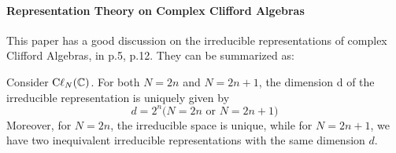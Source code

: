 \documentclass{article}
\begin{document}
\paragraph{Representation Theory on Complex Clifford Algebras}
This paper \cite{West1998} has a good discussion on the irreducible
representations of complex Clifford Algebras, in p.5, p.12. They can be
summarized as:
\begin{thm}
    Consider $\mathrm{C\ell}_{N}(\mathbb{C})$. For both $N = 2n$ and $N = 2n + 1$, the
    dimension d of the irreducible representation is uniquely given by
    \begin{equation}
        d = 2^n \text{($N=2n$ or $N=2n+1$)}
    \end{equation}
    Moreover, for $N = 2n$, the irreducible space is unique, while for $N = 2n +
    1$, we have two inequivalent irreducible representations with the same
    dimension $d$.
\end{thm}
\end{document}
